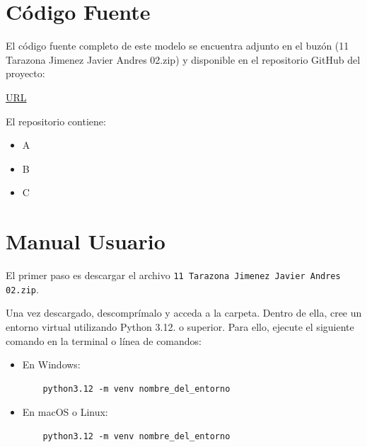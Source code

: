 \documentclass{article}
\begin{document}

\section{Código Fuente}\label{sec:cod}

El código fuente completo de este modelo se encuentra adjunto en el buzón 
(11 Tarazona Jimenez Javier Andres 02.zip)
y disponible en el repositorio GitHub del proyecto:

\begin{center}
\url{URL}
\end{center}

El repositorio contiene:
\begin{itemize}
\item A
\item B
\item C
\end{itemize}


\section{Manual Usuario}\label{sec:man_u}

El primer paso es descargar el archivo \texttt{11 Tarazona Jimenez Javier Andres 02.zip}.

Una vez descargado, descomprímalo y acceda a la carpeta. Dentro de ella, cree un 
entorno virtual utilizando Python 3.12. o superior. Para ello, ejecute el siguiente 
comando en 
la terminal o línea de comandos:

\begin{itemize}
  \item En Windows:
  \begin{verbatim}
    python3.12 -m venv nombre_del_entorno
  \end{verbatim}
  \item En macOS o Linux:
  \begin{verbatim}
    python3.12 -m venv nombre_del_entorno
  \end{verbatim}
\end{itemize}
\end{document}
